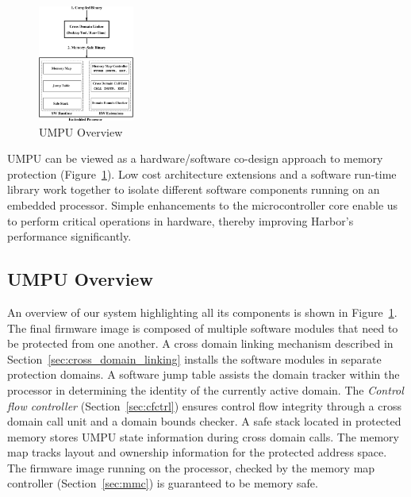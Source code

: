 \begin{figure}[htbp]
   \centering
   \includegraphics[height = 1.5in,
   keepaspectratio=true]{figures/umpuoverview.eps} 
   \caption{UMPU Overview}
   \label{fig:umpuoverview}
\end{figure}
%
UMPU can be viewed as a hardware/software co-design approach to memory
protection (Figure~\ref{fig:umpuoverview}).
%
Low cost architecture extensions and a software run-time library work
together to isolate different software components running on an
embedded processor.
%
%
Simple enhancements to the microcontroller core enable us to perform
critical operations in hardware, thereby improving Harbor's
performance significantly.
%
\subsection{UMPU Overview}
%
An overview of our system highlighting all its components is shown in
Figure~\ref{fig:umpuoverview}.
%
The final firmware image is composed of multiple software modules that
need to be protected from one another.
%
%
A cross domain linking mechanism described in
Section~\ref{sec:cross_domain_linking} installs the software modules
in separate protection domains.
%
A software jump table assists the domain tracker within the processor
in determining the identity of the currently active domain.
%
The \emph{Control flow controller} (Section~\ref{sec:cfctrl}) ensures control flow integrity through a cross domain call unit and a domain bounds checker.
%
A safe stack located in protected memory stores UMPU state information during cross domain calls.
%
The memory map tracks layout and ownership information for the protected address space.
%
The firmware image running on the processor, checked by the  memory
map controller (Section~\ref{sec:mmc}) is guaranteed to be memory
safe.
%
%

